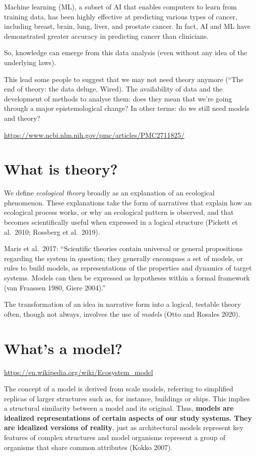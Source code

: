 \documentclass[
]{book}
\theoremstyle{definition}
\theoremstyle{definition}
\theoremstyle{definition}
\theoremstyle{definition}
\theoremstyle{remark}
\begin{document}
Machine learning (ML), a subset of AI that enables computers to learn from training data, has been highly effective at predicting various types of cancer, including breast, brain, lung, liver, and prostate cancer. In fact, AI and ML have demonstrated greater accuracy in predicting cancer than clinicians.

So, knowledge can emerge from this data analysis (even without any idea of the underlying laws).

This lead some people to suggest that we may not need theory anymore (``The end of theory: the data deluge, Wired). The availability of data and the development of methods to analyse them: does they mean that we're going through a major epistemological change? In other terms: do we still need models and theory?

\url{https://www.ncbi.nlm.nih.gov/pmc/articles/PMC2711825/}

\section{What is theory?}\label{what-is-theory}

We define \emph{ecological theory} broadly as an explanation of an ecological phenomenon. These explanations take the form of narratives that explain how an ecological process works, or why an ecological pattern is observed, and that becomes scientifically useful when expressed in a logical structure (Pickett et al.~2010; Rossberg et al.~2019).

Maris et al.~2017: ``Scientific theories contain universal or general propositions regarding the system in question; they generally encompass a set of models, or rules to build models, as representations of the properties and dynamics of target systems. Models can then be expressed as hypotheses within a formal framework (van Fraassen 1980, Giere 2004).''

The transformation of an idea in narrative form into a logical, testable theory often, though not always, involves the use of \emph{models} (Otto and Rosales 2020).

\section{What's a model?}\label{whats-a-model}

\url{https://en.wikipedia.org/wiki/Ecosystem_model}

The concept of a model is derived from scale models, referring to simplified replicas of larger structures such as, for instance, buildings or ships. This implies a structural similarity between a model and its original. Thus, \textbf{models are idealized representations of certain aspects of our study systems. They are idealized versions of reality}, just as architectural models represent key features of complex structures and model organisms represent a group of organisms that share common attributes (Kokko 2007).
\end{document}
